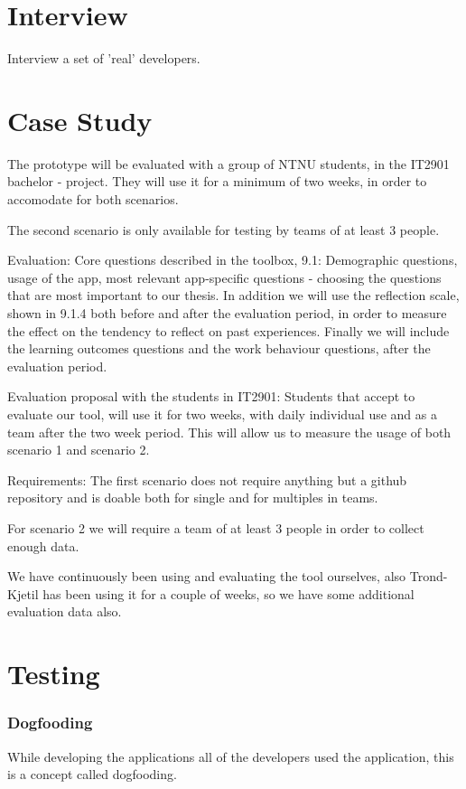 \section{Interview}
Interview a set of 'real' developers.

\section{Case Study}
The prototype will be evaluated with a group of NTNU students, in the IT2901 bachelor - project. They will use it for a minimum of two weeks, in order to accomodate for both scenarios.

The second scenario is only available for testing by teams of at least 3 people.

Evaluation:
Core questions described in the toolbox, 9.1:
Demographic questions, usage of the app, most relevant app-specific questions - choosing the questions that are most important to our thesis. 
In addition we will use the reflection scale, shown in 9.1.4 both before and after the evaluation period, in order to measure the effect on the tendency to reflect on past
experiences. Finally we will include the learning outcomes questions and the work behaviour questions, after the evaluation period. 

Evaluation proposal with the students in IT2901: 
Students that accept to evaluate our tool, will use it for two weeks, with daily individual use and as a team after the two week period. This will allow us to measure the
usage of both scenario 1 and scenario 2.

Requirements:
The first scenario does not require anything but a github repository and is doable both for single and for multiples in teams.

For scenario 2 we will require a team of at least 3 people in order to collect enough data. 

We have continuously been using and evaluating the tool ourselves, also Trond-Kjetil has been using it for a couple of weeks, so we have some additional evaluation
data also. 


\section{Testing}
\subsubsection{Dogfooding}
While developing the applications all of the developers used the application, this is a concept called dogfooding.

